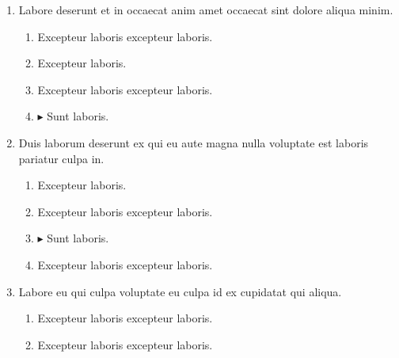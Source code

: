 \documentclass[a4paper,12pt]{article}
\begin{document}
\begin{enumerate}[label=\textbf{\arabic*.}]
\begin{multicols}{2}
\begin{enumerate}
		\item  Excepteur laboris excepteur laboris.
  
		\item $\blacktriangleright$  Sunt laboris.
    
	\end{enumerate}

\end{multicols}
\item Labore deserunt et in occaecat anim amet occaecat sint dolore aliqua minim.
\begin{multicols}{2}
	\begin{enumerate}
		\item  Excepteur laboris excepteur laboris.
    
		\item  Excepteur laboris.
    
		\item  Excepteur laboris excepteur laboris.
  
		\item $\blacktriangleright$  Sunt laboris.
    
	\end{enumerate}

\end{multicols}
\item Duis laborum deserunt ex qui eu aute magna nulla voluptate est laboris pariatur culpa in.
\begin{multicols}{2}
	\begin{enumerate}
		\item  Excepteur laboris.
    
		\item  Excepteur laboris excepteur laboris.
  
		\item $\blacktriangleright$  Sunt laboris.
    
		\item  Excepteur laboris excepteur laboris.
    
	\end{enumerate}

\end{multicols}
\item Labore eu qui culpa voluptate eu culpa id ex cupidatat qui aliqua.
\begin{multicols}{2}
	\begin{enumerate}
		\item  Excepteur laboris excepteur laboris.
  
		\item  Excepteur laboris excepteur laboris.
    

\end{enumerate}
\end{multicols}
\end{enumerate}
\end{document}
